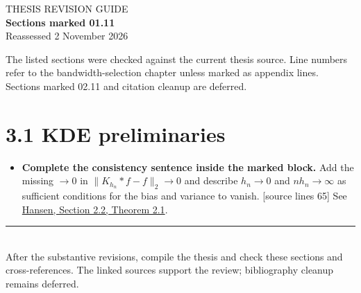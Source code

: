 \documentclass[10pt,a4paper]{article}
\newcommand{\todoitem}[1]{\item[$\square$] \textbf{#1}}
\newcommand{\where}[1]{{\small\color{muted}[source lines #1]}}
\newcommand{\heading}[1]{\section*{\color{ink}#1}}
\begin{document}
{\Large\color{accent} THESIS REVISION GUIDE}\\[0.3em]
{\LARGE\bfseries\color{ink} Sections marked 01.11}\\[0.5em]
{\large Reassessed 2 November 2026}

The listed sections were checked against the current thesis source. Line numbers refer to the bandwidth-selection chapter unless marked as appendix lines. Sections marked 02.11 and citation cleanup are deferred.

\heading{3.1 \quad KDE preliminaries}
\begin{itemize}
\todoitem{Complete the consistency sentence inside the marked block.} Add the missing $\to0$ in $\|K_{h_n}*f-f\|_2\to0$ and describe $h_n\to0$ and $nh_n\to\infty$ as sufficient conditions for the bias and variance to vanish. \where{65} See \href{https://cswr.nrhstat.org/density}{Hansen, Section 2.2, Theorem 2.1}.

\end{itemize}

\vfill
\noindent\rule{\textwidth}{0.3pt}\\[-0.3em]
{\footnotesize\color{muted}After the substantive revisions, compile the thesis and check these sections and cross-references. The linked sources support the review; bibliography cleanup remains deferred.}
\end{document}
